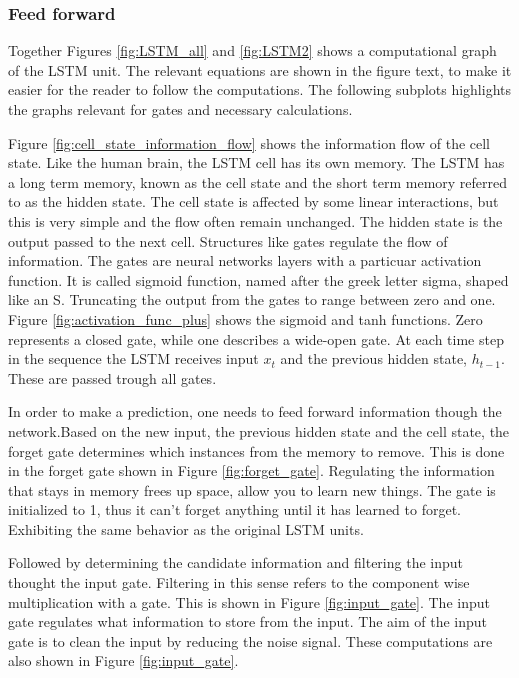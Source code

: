 \documentclass{article}
\begin{document}
\subsubsection{Feed forward} \label{sec:forward_pass_lstm}


Together Figures \ref{fig:LSTM_all} and \ref{fig:LSTM2} shows a computational graph of the LSTM unit. The relevant equations are shown in the figure text, to make it easier for the reader to follow the computations. The following subplots highlights the graphs relevant for gates and necessary calculations. %

Figure  \ref{fig:cell_state_information_flow} shows the information flow of the cell state. Like the human brain, the LSTM cell has its own memory. The LSTM has a long term memory, known as the cell state and the short term memory referred to as the hidden state. The cell state is affected by some linear interactions, but this is very simple and the flow often remain unchanged. The hidden state is the output passed to the next cell. Structures like gates regulate the flow of information. The gates are neural networks layers with a particuar activation function. It is called sigmoid function, named after the greek letter sigma, shaped like an S. Truncating the output from the gates to range between zero and one. Figure \ref{fig:activation_func_plus} shows the sigmoid and tanh functions. Zero represents a closed gate, while one describes a wide-open gate. At each time step in the sequence the LSTM receives input $x_t$ and the previous hidden state, $h_{t-1}$. These are passed trough all gates. 

In order to make a prediction, one needs to feed forward information though the network.Based on the new input, the previous hidden state and the cell state, the forget gate determines which instances from the memory to remove. This is done in the forget gate shown in Figure \ref{fig:forget_gate}. Regulating the information that stays in memory frees up space, allow you to learn new things. The gate is initialized to 1, thus it can't forget anything until it has learned to forget. Exhibiting the same behavior as the original LSTM units. 

Followed by determining the candidate information and filtering the input thought the input gate. Filtering in this sense refers to the component wise multiplication with a gate. This is shown in Figure \ref{fig:input_gate}.  The input gate regulates what information to store from the input. The aim of the input gate is to clean the input by reducing the noise signal. %
These computations are also shown in Figure \ref{fig:input_gate}.
\end{document}
